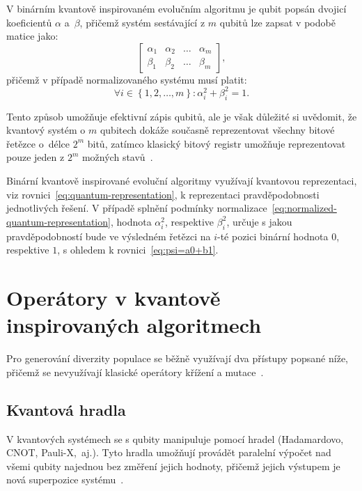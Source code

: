 V binárním kvantově inspirovaném evolučním algoritmu je qubit popsán dvojicí koeficientů $\alpha$ a~$\beta$, přičemž systém sestávající z $m$ qubitů lze zapsat v podobě matice jako: 
\begin{equation}\label{eq:quantum-representation}
    \begin{bmatrix}
        \alpha_1 & \alpha_2 & \dots & \alpha_m \\
        \beta_1  & \beta_2  & \dots & \beta_m
    \end{bmatrix},
\end{equation}
přičemž v případě normalizovaného systému musí platit:
\begin{equation}\label{eq:normalized-quantum-representation}
    \forall i \in \left\{1,2,\dots,m \right\}: \alpha^2_i + \beta^2_i = 1.
\end{equation}

Tento způsob umožňuje efektivní zápis qubitů, ale je však důležité si uvědomit, že kvantový systém o $m$ qubitech dokáže současně reprezentovat všechny bitové řetězce o~délce $2^m$ bitů, zatímco klasický bitový registr umožňuje reprezentovat pouze jeden z $2^m$ možných stavů~\cite{NaturalComputing}. 

Binární kvantově inspirované evoluční algoritmy využívají kvantovou reprezentaci, viz rovnici~\ref{eq:quantum-representation}, k reprezentaci pravděpodobnosti jednotlivých řešení. 
V případě splnění podmínky normalizace~\ref{eq:normalized-quantum-representation}, hodnota $\alpha^2_i$, respektive $\beta^2_i$, určuje s jakou pravděpodobností bude ve výsledném řetězci na $i$-té pozici binární hodnota $0$, respektive $1$, s ohledem k rovnici~\ref{eq:psi=a0+b1}.

\section{Operátory v kvantově inspirovaných algoritmech}
Pro generování diverzity populace se běžně využívají dva přístupy popsané níže, přičemž se nevyužívají klasické operátory křížení a mutace~\cite{NaturalComputing}.

\subsection{Kvantová hradla}\label{subsec:quantum-gates}
V kvantových systémech se s qubity manipuluje pomocí hradel (Hadamardovo, CNOT, Pauli-X,~aj.). 
Tyto hradla umožňují provádět paralelní výpočet nad všemi qubity najednou bez změření jejich hodnoty, přičemž jejich výstupem je nová superpozice systému~\cite{NaturalComputing,QuantumComputing-Curious,QuantumComputing-QuantumInformation}. 

